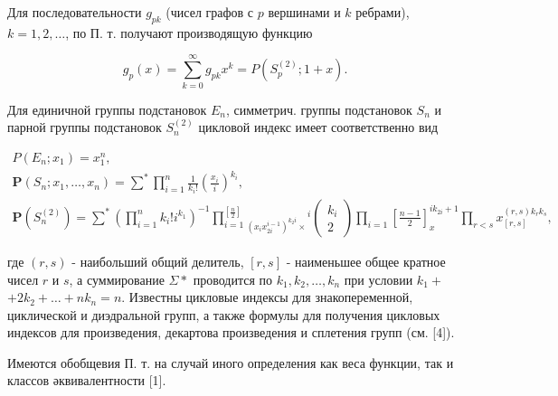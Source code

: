 \documentclass[10pt]{article}
\begin{document}
Для последовательности $g_{p k}$ (чисел графов с $p$ вершинами и $k$ ребрами), $k=1,2, \ldots$, по П. т. получают производящую функцию



\[

g_{p}(x)=\sum_{k=0}^{\infty} g_{p k} x^{k}=P\left(S_{p}^{(2)} ; 1+x\right) .

\]



Для единичной группы подстановок $E_{n}$, симметрич. группы подстановок $S_{n}$ и парной группы подстановок $S_{n}^{(2)}$ цикловой индекс имеет соответственно вид



\[

\begin{gathered}

P\left(E_{n} ; x_{1}\right)=x_{1}^{n}, \\

\boldsymbol{P}\left(S_{n} ; x_{1}, \ldots, x_{n}\right)=\sum^{*} \prod_{i=1}^{n} \frac{1}{k_{i} !}\left(\frac{x_{i}}{i}\right)^{k_{i}}, \\

\boldsymbol{P}\left(S_{n}^{(2)}\right)=\sum^{*}\left(\prod_{i=1}^{n} k_{i} ! i^{k_{1}}\right)^{-1} \prod_{i=1}^{\left[\frac{n}{2}\right]}{ }_{\left(x_{i} x_{2 i}^{i-1}\right)^{k_{2} i} \times}{ }^{i}\left(\begin{array}{c}

k_{i} \\

2

\end{array}\right) \prod_{i=1}\left[\frac{n-1}{2}\right]_{x}^{i k_{2 i}+1} \prod_{r<s} x_{[r, s]}^{(r, s) k_{r} k_{s}},

\end{gathered}

\]



где $(r, s)$ - наибольший общий делитель, $[r, s]$ - наименьшее общее кратное чисел $r$ и $s$, а суммирование $\Sigma *$ проводится по $k_{1}, k_{2}, \ldots, k_{n}$ при условии $k_{1}+$ $+2 k_{2}+\ldots+n k_{n}=n$. Известны цикловые индексы для знакопеременной, циклической и диэдральной групп, а также формулы для получения цикловых индексов для произведения, декартова произведения и сплетения групп (см. [4]).



Имеются обобщевия П. т. на случай иного определения как веса функции, так и классов әквивалентности [1].
\end{document}
